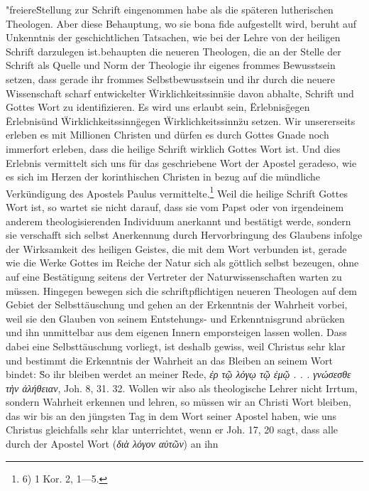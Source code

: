 "freiere\" Stellung zur Schrift eingenommen habe als die späteren lutherischen Theologen. Aber diese Behauptung, wo sie bona fide aufgestellt wird, beruht auf Unkenntnis der geschichtlichen Tatsachen, wie bei der Lehre von der heiligen Schrift darzulegen ist.\n\nBekanntlich behaupten die neueren Theologen, die an der Stelle der Schrift als Quelle und Norm der Theologie ihr eigenes frommes Bewusstsein setzen, dass gerade ihr frommes Selbstbewusstsein und ihr durch die neuere Wissenschaft scharf entwickelter \"Wirklichkeitssinn\" sie davon abhalte, Schrift und Gottes Wort zu identifizieren. Es wird uns erlaubt sein, \"Erlebnis\" gegen \"Erlebnis\" und \"Wirklichkeitssinn\" gegen \"Wirklichkeitssinn\" zu setzen. Wir unsererseits erleben es mit Millionen Christen und dürfen es durch Gottes Gnade noch immerfort erleben, dass die heilige Schrift wirklich Gottes Wort ist. Und dies Erlebnis vermittelt sich uns für das geschriebene Wort der Apostel geradeso, wie es sich im Herzen der korinthischen Christen in bezug auf die mündliche Verkündigung des Apostels Paulus vermittelte.\footnote{6) 1 Kor. 2, 1---5.} Weil die heilige Schrift Gottes Wort ist, so wartet sie nicht darauf, dass sie vom Papst oder von irgendeinem anderem theologisierenden Individuum anerkannt und bestätigt werde, sondern sie verschafft sich selbst Anerkennung durch Hervorbringung des Glaubens infolge der Wirksamkeit des heiligen Geistes, die mit dem Wort verbunden ist, gerade wie die Werke Gottes im Reiche der Natur sich als göttlich selbst bezeugen, ohne auf eine Bestätigung seitens der Vertreter der Naturwissenschaften warten zu müssen. Hingegen bewegen sich die schriftpflichtigen neueren Theologen auf dem Gebiet der Selbsttäuschung und gehen an der Erkenntnis der Wahrheit vorbei, weil sie den Glauben von seinem Entstehungs- und Erkenntnisgrund abrücken und ihn unmittelbar aus dem eigenen Innern emporsteigen lassen wollen. Dass dabei eine Selbsttäuschung vorliegt, ist deshalb gewiss, weil Christus sehr klar und bestimmt die Erkenntnis der Wahrheit an das Bleiben an seinem Wort bindet: \"So ihr bleiben werdet an meiner Rede, \textit{ἐρ τῷ λόγῳ τῷ ἐμῷ . . . γνώσεσθε τὴν ἀλήθειαν}, Joh. 8, 31. 32. Wollen wir also als theologische Lehrer nicht Irrtum, sondern Wahrheit erkennen und lehren, so müssen wir an Christi Wort bleiben, das wir bis an den jüngsten Tag in dem Wort seiner Apostel haben, wie uns Christus gleichfalls sehr klar unterrichtet, wenn er Joh. 17, 20 sagt, dass alle durch der Apostel Wort (\textit{διὰ λόγον αὐτῶν}) an ihn